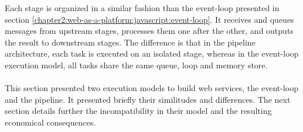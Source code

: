 Each stage is organized in a similar fashion than the event-loop presented in section \ref{chapter2:web-as-a-platform:javascript:event-loop}.
It receives and queues messages from upstream stages, processes them one after the other, and outputs the result to downstream stages.
The difference is that in the pipeline architecture, each task is executed on an isolated stage, whereas in the event-loop execution model, all tasks share the same queue, loop and memory store.

\paragraph{}

This section presented two execution models to build web services, the event-loop and the pipeline.
It presented briefly their similitudes and differences.
The next section details further the incompatibility in their model and the resulting economical consequences.
